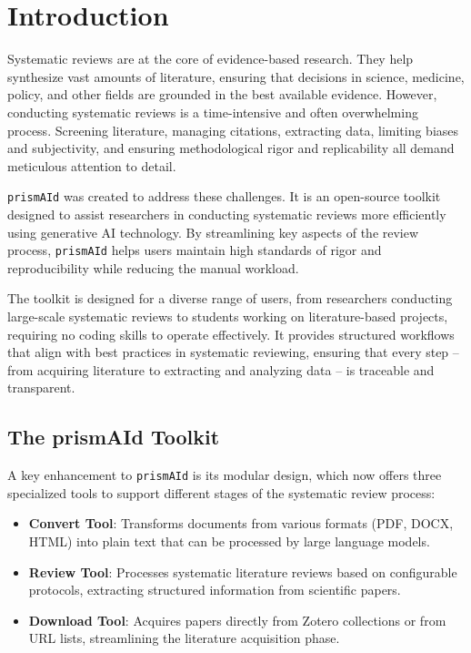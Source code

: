 \chapter{Introduction} \label{chap:intro}

Systematic reviews are at the core of evidence-based research. They help synthesize vast amounts of literature, ensuring that decisions in science, medicine, policy, and other fields are grounded in the best available evidence. However, conducting systematic reviews is a time-intensive and often overwhelming process. Screening literature, managing citations, extracting data, limiting biases and subjectivity, and ensuring methodological rigor and replicability all demand meticulous attention to detail.

\texttt{prismAId} was created to address these challenges. It is an open-source toolkit designed to assist researchers in conducting systematic reviews more efficiently using generative AI technology. By streamlining key aspects of the review process, \texttt{prismAId} helps users maintain high standards of rigor and reproducibility while reducing the manual workload.

The toolkit is designed for a diverse range of users, from researchers conducting large-scale systematic reviews to students working on literature-based projects, requiring no coding skills to operate effectively. It provides structured workflows that align with best practices in systematic reviewing, ensuring that every step -- from acquiring literature to extracting and analyzing data -- is traceable and transparent.

\bigskip

\section{The prismAId Toolkit}

A key enhancement to \texttt{prismAId} is its modular design, which now offers three specialized tools to support different stages of the systematic review process:

\begin{itemize}
    \item \textbf{Convert Tool}: Transforms documents from various formats (PDF, DOCX, HTML) into plain text that can be processed by large language models.

    \item \textbf{Review Tool}: Processes systematic literature reviews based on configurable protocols, extracting structured information from scientific papers.

    \item \textbf{Download Tool}: Acquires papers directly from Zotero collections or from URL lists, streamlining the literature acquisition phase.
\end{itemize}

